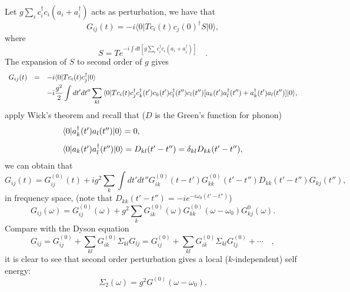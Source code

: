 \documentclass{book}
\newcommand{\bra}[1]{{\langle#1|}}
\newcommand{\ket}[1]{{|#1\rangle}}
\numberwithin{equation}{section}
\begin{document}
Let $g\sum_ic_i^\dag c_i(a_i+a_i^\dag)$ acts as perturbation, we have
that
\begin{equation}
  G_{ij}(t)=-i\bra{0}Tc_i(t)c_j(0)^\dag S\ket{0},
\end{equation}
where
\begin{equation}
  S=Te^{-i\int dt [g\sum_ic_i^\dag c_i(a_i+a_i^\dag)]}\quad.
\end{equation}
The expansion of $S$ to second order of $g$ gives
\begin{equation}
  \begin{array}{rcl}
  G_{ij}(t)&=&-i\bra{0}Tc_i(t)c_j^\dag\ket{0}\\\vbox to 18pt{}
  & &-i\displaystyle\frac{g^2}{2}\int dt'dt''\sum_{kl}
  \bra{0}Tc_i(t)c_j^\dag c_k^\dag(t')c_k(t')c_l^\dag(t'')c_l(t'')
  [a_k(t')a_l^\dag(t'')+a_k^\dag(t')a_l(t'')]\ket{0},\\
  \end{array}
\end{equation}
apply Wick's theorem and recall that ($D$ is the Green's function for phonon)
\begin{equation}
  \begin{array}{l}
    \bra{0}a_k^\dag(t')a_l(t'')\ket{0}=0,\\\vbox to 18pt{}
    \bra{0}a_k(t')a_l^\dag(t'')\ket{0}=D_{kl}(t'-t'')=\delta_{kl}D_{kk}(t'-t''),\\
  \end{array}
\end{equation}
we can obtain that
\begin{equation}
  G_{ij}(t)=G^{(0)}_{ij}(t)+ig^2\sum_k\int dt'dt''G^{(0)}_{ik}(t-t')
  G^{(0)}_{kk}(t'-t'')D_{kk}(t'-t'')G_{kj}(t''),
\end{equation}
in frequency space, (note that $D_{kk}(t'-t'')=-ie^{-i\omega_0(t'-t'')}$)
\begin{equation}
  G_{ij}(\omega)=G^{(0)}_{ij}(\omega)+
  g^2\sum_{k}G^{(0)}_{ik}(\omega)G_{kk}^{(0)}(\omega-\omega_0)G^{0}_{kj}(\omega).
\end{equation}
Compare with the Dyson equation
\begin{equation}
  G_{ij}=G^{(0)}_{ij}+\sum_{kl}G^{(0)}_{ik}\Sigma_{kl}G_{lj}
  =G^{(0)}_{ij}+\sum_{kl}G^{(0)}_{ik}\Sigma_{kl}G^{(0)}_{lj}+\cdots\quad,
\end{equation}
it is clear to see that second order perturbation gives a local
($k$-independent) self energy:
\begin{equation}
  \Sigma_2(\omega)=g^2G^{(0)}(\omega-\omega_0).
\end{equation}
\end{document}
